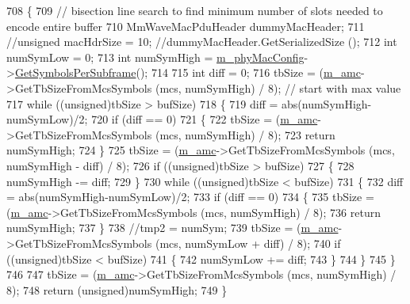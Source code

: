 \begin{DoxyCode}
708 \{
709         \textcolor{comment}{// bisection line search to find minimum number of slots needed to encode entire buffer}
710         MmWaveMacPduHeader dummyMacHeader;
711         \textcolor{comment}{//unsigned macHdrSize = 10; //dummyMacHeader.GetSerializedSize ();}
712         \textcolor{keywordtype}{int} numSymLow = 0;
713         \textcolor{keywordtype}{int} numSymHigh = \hyperlink{classns3_1_1MmWaveMacScheduler_a24d7af4971d2e500fe543cefbafa2fd9}{m\_phyMacConfig}->\hyperlink{classns3_1_1MmWavePhyMacCommon_a2fe835b76e3c689defa413e395cd10cb}{GetSymbolsPerSubframe}();
714 
715         \textcolor{keywordtype}{int} diff = 0;
716         tbSize = (\hyperlink{classns3_1_1MmWaveFlexTtiMaxRateMacScheduler_a8a84d69426586fddd45abe7174da607d}{m\_amc}->GetTbSizeFromMcsSymbols (mcs, numSymHigh) / 8); \textcolor{comment}{// start with max value}
717         \textcolor{keywordflow}{while} ((\textcolor{keywordtype}{unsigned})tbSize > bufSize)
718         \{
719                 diff = abs(numSymHigh-numSymLow)/2;
720                 \textcolor{keywordflow}{if} (diff == 0)
721                 \{
722                         tbSize = (\hyperlink{classns3_1_1MmWaveFlexTtiMaxRateMacScheduler_a8a84d69426586fddd45abe7174da607d}{m\_amc}->GetTbSizeFromMcsSymbols (mcs, numSymHigh) / 8);
723                         \textcolor{keywordflow}{return} numSymHigh;
724                 \}
725                 tbSize = (\hyperlink{classns3_1_1MmWaveFlexTtiMaxRateMacScheduler_a8a84d69426586fddd45abe7174da607d}{m\_amc}->GetTbSizeFromMcsSymbols (mcs, numSymHigh - diff) / 8);
726                 \textcolor{keywordflow}{if} ((\textcolor{keywordtype}{unsigned})tbSize > bufSize)
727                 \{
728                         numSymHigh -= diff;
729                 \}
730                 \textcolor{keywordflow}{while} ((\textcolor{keywordtype}{unsigned})tbSize < bufSize)
731                 \{
732                         diff = abs(numSymHigh-numSymLow)/2;
733                         \textcolor{keywordflow}{if} (diff == 0)
734                         \{
735                                 tbSize = (\hyperlink{classns3_1_1MmWaveFlexTtiMaxRateMacScheduler_a8a84d69426586fddd45abe7174da607d}{m\_amc}->GetTbSizeFromMcsSymbols (mcs, numSymHigh) / 8);
736                                 \textcolor{keywordflow}{return} numSymHigh;
737                         \}
738                         \textcolor{comment}{//tmp2 = numSym;}
739                         tbSize = (\hyperlink{classns3_1_1MmWaveFlexTtiMaxRateMacScheduler_a8a84d69426586fddd45abe7174da607d}{m\_amc}->GetTbSizeFromMcsSymbols (mcs, numSymLow + diff) / 8);
740                         \textcolor{keywordflow}{if} ((\textcolor{keywordtype}{unsigned})tbSize < bufSize)
741                         \{
742                                 numSymLow += diff;
743                         \}
744                 \}
745         \}
746 
747         tbSize = (\hyperlink{classns3_1_1MmWaveFlexTtiMaxRateMacScheduler_a8a84d69426586fddd45abe7174da607d}{m\_amc}->GetTbSizeFromMcsSymbols (mcs, numSymHigh) / 8);
748         \textcolor{keywordflow}{return} (\textcolor{keywordtype}{unsigned})numSymHigh;
749 \}
\end{DoxyCode}


